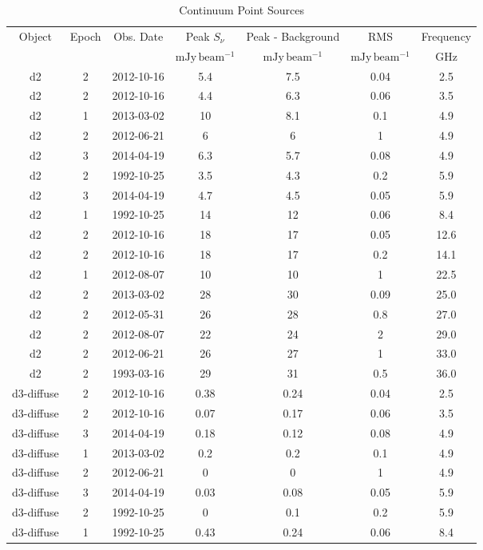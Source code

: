 \begin{table*}[htp]
\caption{Continuum Point Sources}
\begin{tabular}{ccccccc}
\label{tab:contsrcs_full}
Object & Epoch & Obs. Date & Peak $S_{\nu}$ & Peak - Background & RMS & Frequency \\
 &  &  & $\mathrm{mJy\,beam^{-1}}$ & $\mathrm{mJy\,beam^{-1}}$ & $\mathrm{mJy\,beam^{-1}}$ & $\mathrm{GHz}$ \\
\hline
d2 & 2 & 2012-10-16 & 5.4 & 7.5 & 0.04 & 2.5 \\
d2 & 2 & 2012-10-16 & 4.4 & 6.3 & 0.06 & 3.5 \\
d2 & 1 & 2013-03-02 & 10 & 8.1 & 0.1 & 4.9 \\
d2 & 2 & 2012-06-21 & 6 & 6 & 1 & 4.9 \\
d2 & 3 & 2014-04-19 & 6.3 & 5.7 & 0.08 & 4.9 \\
d2 & 2 & 1992-10-25 & 3.5 & 4.3 & 0.2 & 5.9 \\
d2 & 3 & 2014-04-19 & 4.7 & 4.5 & 0.05 & 5.9 \\
d2 & 1 & 1992-10-25 & 14 & 12 & 0.06 & 8.4 \\
d2 & 2 & 2012-10-16 & 18 & 17 & 0.05 & 12.6 \\
d2 & 2 & 2012-10-16 & 18 & 17 & 0.2 & 14.1 \\
d2 & 1 & 2012-08-07 & 10 & 10 & 1 & 22.5 \\
d2 & 2 & 2013-03-02 & 28 & 30 & 0.09 & 25.0 \\
d2 & 2 & 2012-05-31 & 26 & 28 & 0.8 & 27.0 \\
d2 & 2 & 2012-08-07 & 22 & 24 & 2 & 29.0 \\
d2 & 2 & 2012-06-21 & 26 & 27 & 1 & 33.0 \\
d2 & 2 & 1993-03-16 & 29 & 31 & 0.5 & 36.0 \\
d3-diffuse & 2 & 2012-10-16 & 0.38 & 0.24 & 0.04 & 2.5 \\
d3-diffuse & 2 & 2012-10-16 & 0.07 & 0.17 & 0.06 & 3.5 \\
d3-diffuse & 3 & 2014-04-19 & 0.18 & 0.12 & 0.08 & 4.9 \\
d3-diffuse & 1 & 2013-03-02 & 0.2 & 0.2 & 0.1 & 4.9 \\
d3-diffuse & 2 & 2012-06-21 & 0 & 0 & 1 & 4.9 \\
d3-diffuse & 3 & 2014-04-19 & 0.03 & 0.08 & 0.05 & 5.9 \\
d3-diffuse & 2 & 1992-10-25 & 0 & 0.1 & 0.2 & 5.9 \\
d3-diffuse & 1 & 1992-10-25 & 0.43 & 0.24 & 0.06 & 8.4 \\

\end{tabular}
\end{table*}
